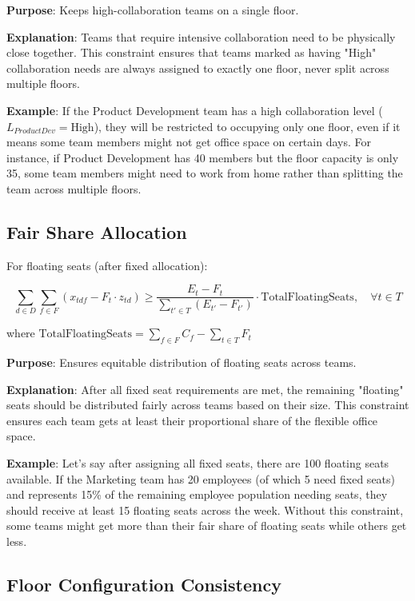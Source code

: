 \documentclass[12pt,a4paper]{article}
\begin{document}
\textbf{Purpose}: Keeps high-collaboration teams on a single floor.

\textbf{Explanation}: Teams that require intensive collaboration need to be physically close together. This constraint ensures that teams marked as having "High" collaboration needs are always assigned to exactly one floor, never split across multiple floors.

\textbf{Example}: If the Product Development team has a high collaboration level ($L_{ProductDev} = \text{High}$), they will be restricted to occupying only one floor, even if it means some team members might not get office space on certain days. For instance, if Product Development has 40 members but the floor capacity is only 35, some team members might need to work from home rather than splitting the team across multiple floors.

\subsection{Fair Share Allocation}

For floating seats (after fixed allocation):

\begin{equation}
\sum_{d\in D} \sum_{f\in F} (x_{tdf} - F_t \cdot z_{td}) \geq \frac{E_t - F_t}{\sum_{t'\in T} (E_{t'} - F_{t'})} \cdot \text{TotalFloatingSeats}, \quad \forall t \in T
\end{equation}

where $\text{TotalFloatingSeats} = \sum_{f\in F} C_f - \sum_{t\in T} F_t$

\textbf{Purpose}: Ensures equitable distribution of floating seats across teams.

\textbf{Explanation}: After all fixed seat requirements are met, the remaining "floating" seats should be distributed fairly across teams based on their size. This constraint ensures each team gets at least their proportional share of the flexible office space.

\textbf{Example}: Let's say after assigning all fixed seats, there are 100 floating seats available. If the Marketing team has 20 employees (of which 5 need fixed seats) and represents 15\% of the remaining employee population needing seats, they should receive at least 15 floating seats across the week. Without this constraint, some teams might get more than their fair share of floating seats while others get less.

\subsection{Floor Configuration Consistency}
\end{document}
